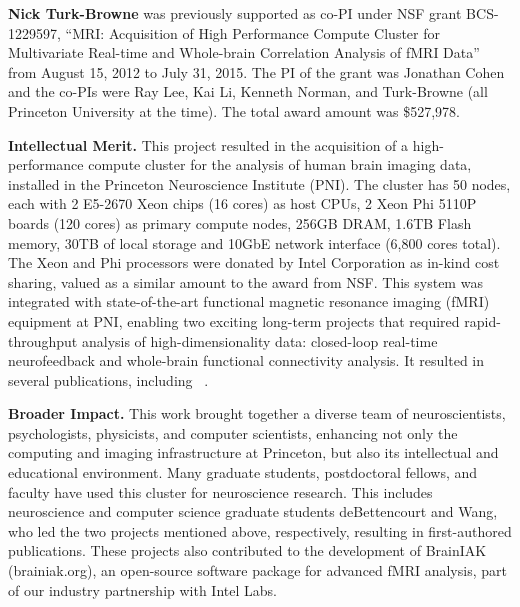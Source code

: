 

\textbf{Nick Turk-Browne} was previously supported as co-PI under NSF
grant BCS-1229597, ``MRI: Acquisition of High Performance Compute
Cluster for Multivariate Real-time and Whole-brain Correlation
Analysis of fMRI Data'' from August 15, 2012 to July 31, 2015. The PI
of the grant was Jonathan Cohen and the co-PIs were Ray Lee, Kai Li,
Kenneth Norman, and Turk-Browne (all Princeton University at the
time). The total award amount was \$527,978.

{\bf Intellectual Merit.} This project resulted in the acquisition of
a high-performance compute cluster for the analysis of human brain
imaging data, installed in the Princeton Neuroscience Institute (PNI).
The cluster has 50 nodes, each with 2 E5-2670 Xeon chips
(16 cores) as host CPUs, 2 Xeon Phi 5110P boards (120 cores) as primary compute nodes, 256GB DRAM, 1.6TB Flash memory,
30TB of local storage and 10GbE network interface (6,800 cores total).
The Xeon and Phi processors were donated by Intel Corporation as
in-kind cost sharing, valued as a similar amount to the award from
NSF. This system was integrated with state-of-the-art functional
magnetic resonance imaging (fMRI) equipment at PNI, enabling two
exciting long-term projects that required rapid-throughput analysis of
high-dimensionality data: closed-loop real-time neurofeedback and
whole-brain functional connectivity analysis. It resulted in several
publications, including
~\citep{Cohen:2017,deBettencourt:2015,Turk-Browne:2013,Wang:2015}.

{\bf Broader Impact.} This work brought together a diverse team of
neuroscientists, psychologists, physicists, and computer scientists,
enhancing not only the computing and imaging infrastructure at
Princeton, but also its intellectual and educational environment. Many
graduate students, postdoctoral fellows, and faculty have used this
cluster for neuroscience research. This includes neuroscience and
computer science graduate students deBettencourt and Wang, who led
the two projects mentioned above, respectively, resulting in
first-authored publications. These projects also contributed to the
development of BrainIAK (brainiak.org), an open-source software package for advanced fMRI analysis, part of our industry partnership with Intel Labs.

